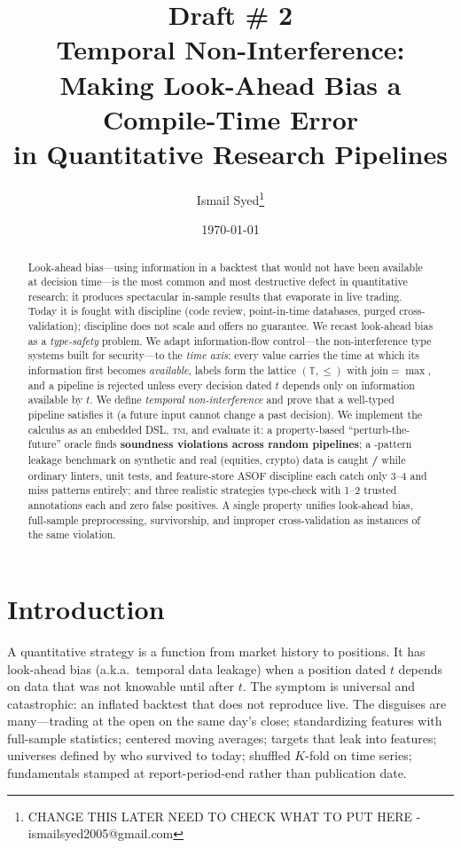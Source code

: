 \documentclass[11pt]{article}
\title{\textbf{Draft \# 2 \\ Temporal Non-Interference:\\ Making Look-Ahead Bias a Compile-Time Error\\ in Quantitative Research Pipelines}}
\author{Ismail Syed\thanks{CHANGE THIS LATER NEED TO CHECK WHAT TO PUT HERE - ismailsyed2005@gmail.com}}
\date{\today}
\newcommand{\tni}{\textsc{tni}}
\theoremstyle{plain}
\theoremstyle{definition}
\begin{document}
\maketitle

\begin{abstract}
Look-ahead bias---using information in a backtest that would not have been
available at decision time---is the most common and most destructive defect in
quantitative research: it produces spectacular in-sample results that evaporate
in live trading. Today it is fought with discipline (code review, point-in-time
databases, purged cross-validation); discipline does not scale and offers no
guarantee. We recast look-ahead bias as a \emph{type-safety} problem. We adapt
information-flow control---the non-interference type systems built for
security---to the \emph{time axis}: every value carries the time at which its
information first becomes \emph{available}, labels form the lattice
$(\mathbb{T},\le)$ with $\text{join}=\max$, and a pipeline is rejected unless
every decision dated $t$ depends only on information available by $t$. We define
\emph{temporal non-interference} and prove that a well-typed pipeline satisfies
it (a future input cannot change a past decision). We implement the calculus as
an embedded DSL, \tni, and evaluate it: a property-based ``perturb-the-future''
oracle finds \textbf{\honeViol{} soundness violations across \honeTotal{} random
pipelines}; a \benchN-pattern leakage benchmark on synthetic and real (equities,
crypto) data is caught \textbf{\benchTni/\benchN} while ordinary linters, unit
tests, and feature-store ASOF discipline each catch only 3--4 and miss
\benchMissed{} patterns entirely; and three realistic strategies type-check with
1--2 trusted annotations each and zero false positives. A single property
unifies look-ahead bias, full-sample preprocessing, survivorship, and improper
cross-validation as instances of the same violation.
\end{abstract}

\section{Introduction}

A quantitative strategy is a function from market history to positions. It has
look-ahead bias (a.k.a.\ temporal data leakage) when a position dated $t$ depends
on data that was not knowable until after $t$. The symptom is universal and
catastrophic: an inflated backtest that does not reproduce live. The disguises
are many---trading at the open on the same day's close; standardizing features
with full-sample statistics; centered moving averages; targets that leak into
features; universes defined by who survived to today; shuffled $K$-fold on time
series; fundamentals stamped at report-period-end rather than publication date.
\end{document}
